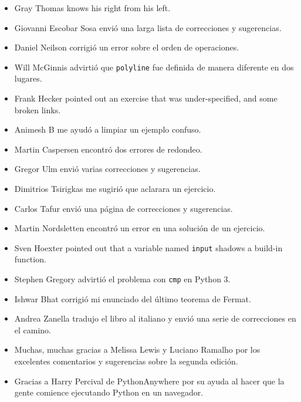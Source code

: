\documentclass[10pt]{book}
\begin{document}
\begin{itemize}
\item Gray Thomas knows his right from his left.

\item Giovanni Escobar Sosa envió una larga lista de correcciones y
sugerencias.

\item Daniel Neilson corrigió un error sobre el orden de operaciones.

\item Will McGinnis advirtió que {\tt polyline} fue definida
de manera diferente en dos lugares.

\item Frank Hecker pointed out an exercise that was under-specified, and
some broken links.

\item Animesh B me ayudó a limpiar un ejemplo confuso.

\item Martin Caspersen encontró dos errores de redondeo.

\item Gregor Ulm envió varias correcciones y sugerencias.

\item Dimitrios Tsirigkas me sugirió que aclarara un ejercicio.

\item Carlos Tafur envió una página de correcciones y sugerencias.

\item Martin Nordsletten encontró un error en una solución de un ejercicio.

\item Sven Hoexter pointed out that a variable named {\tt input}
shadows a build-in function.

\item Stephen Gregory advirtió el problema con {\tt cmp}
en Python 3.

\item Ishwar Bhat corrigió mi enunciado del último teorema de Fermat.

\item Andrea Zanella tradujo el libro al italiano y envió una
serie de correcciones en el camino.

\item Muchas, muchas gracias a Melissa Lewis y Luciano Ramalho por
  los excelentes comentarios y sugerencias sobre la segunda edición.

\item Gracias a Harry Percival de PythonAnywhere por su ayuda
al hacer que la gente comience ejecutando Python en un navegador.


\end{itemize}
\end{document}
